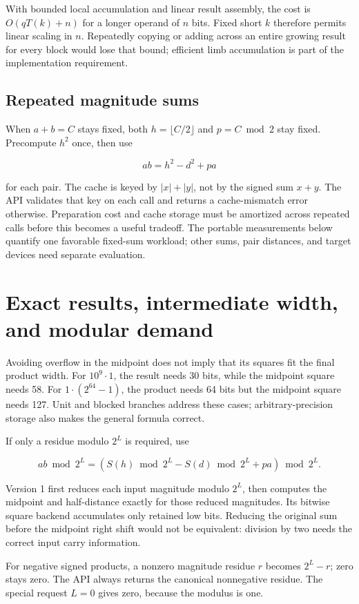 \documentclass[11pt,a4paper]{article}
\begin{document}
With bounded local accumulation and linear result assembly, the cost is $O(qT(k)+n)$ for a longer operand of $n$ bits. Fixed short $k$ therefore permits linear scaling in $n$. Repeatedly copying or adding across an entire growing result for every block would lose that bound; efficient limb accumulation is part of the implementation requirement.

\subsection{Repeated magnitude sums}

When $a+b=C$ stays fixed, both $h=\lfloor C/2\rfloor$ and $p=C\bmod2$ stay fixed. Precompute $h^2$ once, then use

\[
ab=h^2-d^2+pa
\]

for each pair. The cache is keyed by $|x|+|y|$, not by the signed sum $x+y$. The API validates that key on each call and returns a cache-mismatch error otherwise. Preparation cost and cache storage must be amortized across repeated calls before this becomes a useful tradeoff. The portable measurements below quantify one favorable fixed-sum workload; other sums, pair distances, and target devices need separate evaluation.

\section{Exact results, intermediate width, and modular demand}

Avoiding overflow in the midpoint does not imply that its squares fit the final product width. For $10^9\cdot1$, the result needs 30 bits, while the midpoint square needs 58. For $1\cdot(2^{64}-1)$, the product needs 64 bits but the midpoint square needs 127. Unit and blocked branches address these cases; arbitrary-precision storage also makes the general formula correct.

If only a residue modulo $2^L$ is required, use

\[
ab\bmod2^L=(S(h)\bmod2^L-S(d)\bmod2^L+pa)\bmod2^L.
\]

Version 1 first reduces each input magnitude modulo $2^L$, then computes the midpoint and half-distance exactly for those reduced magnitudes. Its bitwise square backend accumulates only retained low bits. Reducing the original sum before the midpoint right shift would not be equivalent: division by two needs the correct input carry information.

For negative signed products, a nonzero magnitude residue $r$ becomes $2^L-r$; zero stays zero. The API always returns the canonical nonnegative residue. The special request $L=0$ gives zero, because the modulus is one.
\end{document}
